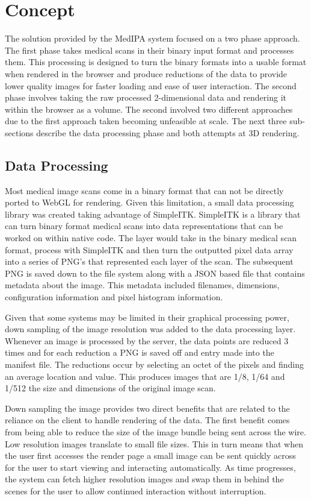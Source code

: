 \documentclass[annual]{acmsiggraph}
\begin{document}
\section{Concept}
	The solution provided by the MedIPA system focused on a two phase approach.  The first phase takes medical scans in their binary input format and processes them.  This processing is designed to turn the binary formats into a usable format when rendered in the browser and produce reductions of the data to provide lower quality images for faster loading and ease of user interaction.  The second phase involves taking the raw processed 2-dimensional data and rendering it within the browser as a volume.  The second involved two different approaches due to the first approach taken becoming unfeasible at scale.  The next three sub-sections describe the data processing phase and both attempts at 3D rendering.

\subsection{Data Processing}

Most medical image scans come in a binary format that can not be directly ported to WebGL for rendering.  Given this limitation, a small data processing library was created taking advantage of SimpleITK.  SimpleITK is a library that can turn binary format medical scans into data representations that can be worked on within native code.  The layer would take in the binary medical scan format, process with SimpleITK and then turn the outputted pixel data array into a series of PNG's that represented each layer of the scan.  The subsequent PNG is saved down to the file system along with a JSON based file that contains metadata about the image.  This metadata included filenames, dimensions, configuration information and pixel histogram information.

Given that some systems may be limited in their graphical processing power, down sampling of the image resolution was added to the data processing layer.  Whenever an image is processed by the server, the data points are reduced 3 times and for each reduction a PNG is saved off and entry made into the manifest file.  The reductions occur by selecting an octet of the pixels and finding an average location and value.  This produces images that are 1/8, 1/64 and 1/512 the size and dimensions of the original image scan.

Down sampling the image provides two direct benefits that are related to the reliance on the client to handle rendering of the data.  The first benefit comes from being able to reduce the size of the image bundle being sent across the wire.  Low resolution images translate to small file sizes.  This in turn means that when the user first accesses the render page a small image can be sent quickly across for the user to start viewing and interacting automatically.  As time progresses, the system can fetch higher resolution images and swap them in behind the scenes for the user to allow continued interaction without interruption.  
\end{document}
